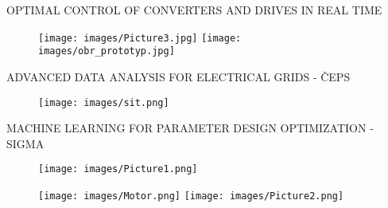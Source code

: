 \documentclass[11pt, aspectratio=169]{beamer}
\newenvironment{wideitemize}{\itemize\addtolength{\itemsep}{10pt}}{\enditemize}
\begin{document}

\begin{comment}
\begin{frame}{Past topics}
\begin{wideitemize}
\item Cooperation with ZČU: optimal control of drives (papers 2017, 2017, 2023), electrostatic separator (2014), DC overhead wire circuit modelling (2021), electromagnetic valves.
\pause \item Mathematical optimization: nonsmooth optimization, stochastic optimization, optimization with PDEs, evolutionary optimization, classification at the top.
\item Machine learning: accuracy at the top.
\item Game theory: coalitional games.
\end{wideitemize}
\end{frame}
\end{comment}


\begin{frame}{OPTIMAL CONTROL OF CONVERTERS AND DRIVES IN REAL TIME}
\begin{figure}
\centering
\texttt{[image: images/Picture3.jpg]}
\hspace{1mm}
\texttt{[image: images/obr\_prototyp.jpg]}
\end{figure}
\end{frame}


\begin{frame}{ADVANCED DATA ANALYSIS FOR ELECTRICAL GRIDS - ČEPS}
\begin{figure}
\centering
\texttt{[image: images/sit.png]}
\end{figure}
\end{frame}


\begin{frame}{MACHINE LEARNING FOR PARAMETER DESIGN OPTIMIZATION - SIGMA}
\hspace{-10mm}
\begin{minipage}[t]{0.77\textwidth}
\begin{figure}
\centering
\texttt{[image: images/Picture1.png]}
\end{figure}
\end{minipage}
\hfill
\begin{minipage}[t]{0.28\textwidth}
\vspace{15mm}
\begin{figure}
\centering
\texttt{[image: images/Motor.png]}
\phantom{.}\vspace{-73mm}
\texttt{[image: images/Picture2.png]}
\end{figure}
\end{minipage}
\end{frame}
\end{document}
